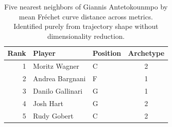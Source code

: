 \begin{table}[htbp]
  \centering\small
  \begin{tabular}{rllc}
    \toprule
    Rank & Player & Position & Archetype \\
    \midrule
    1 & Moritz Wagner & C & 2 \\
    2 & Andrea Bargnani & F & 1 \\
    3 & Danilo Gallinari & G & 1 \\
    4 & Josh Hart & G & 2 \\
    5 & Rudy Gobert & C & 2 \\
    \bottomrule
  \end{tabular}
  \caption{Five nearest neighbors of Giannis Antetokounmpo by mean Fr\'{e}chet curve distance across metrics. Identified purely from trajectory shape without dimensionality reduction.}
  \label{tab:Giannis_Antetokounmpo_frechet_curve_neighbors}
\end{table}

